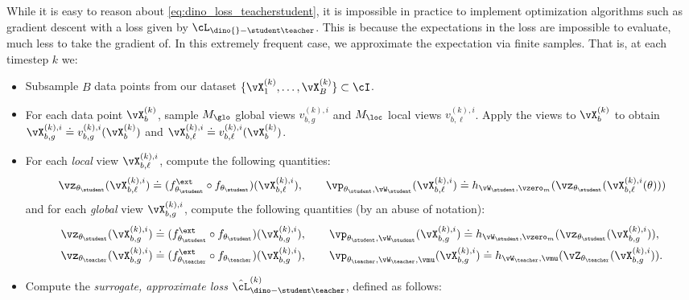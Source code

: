 \documentclass[../../book-main.tex]{subfiles}
\begin{document}
While it is easy to reason about \eqref{eq:dino_loss_teacherstudent}, it is impossible in practice to implement optimization algorithms such as gradient descent with a loss given by \(\cL_{\dino{}-\student\teacher}\). This is because the expectations in the loss are impossible to evaluate, much less to take the gradient of. In this extremely frequent case, we approximate the expectation via finite samples. That is, at each timestep \(k\) we:
\begin{itemize}
    \item Subsample \(B\) data points from our dataset \(\{\vX_{1}^{(k)}, \dots, \vX_{B}^{(k)}\} \subset \cI\).
    \item For each data point \(\vX_{b}^{(k)}\), sample \(M_{\glo}\) global views \(v_{b, g}^{(k), i}\) and \(M_{\loc}\) local views \(v_{b, \ell}^{(k), i}\). Apply the views to \(\vX_{b}^{(k)}\) to obtain \(\vX_{b, g}^{(k), i} \doteq v_{b, g}^{(k), i}(\vX_{b}^{(k)})\) and \(\vX_{b, \ell}^{(k), i} \doteq v_{b, \ell}^{(k), i}(\vX_{b}^{(k)})\).
    \item For each \textit{local} view \(\vX_{b, \ell}^{(k), i}\), compute the following quantities:
    \begin{equation}
        \vz_{\theta_{\student}}(\vX_{b, \ell}^{(k), i}) \doteq (f_{\theta_{\student}}^{\ext} \circ f_{\theta_{\student}})(\vX_{b, \ell}^{(k), i}), \qquad \vp_{\theta_{\student}, \vW_{\student}}(\vX_{b, \ell}^{(k), i}) \doteq h_{\vW_{\student}, \vzero_{m}}(\vz_{\theta_{\student}}(\vX_{b, \ell}^{(k), i}(\theta)))
    \end{equation}
    and for each \textit{global} view \(\vX_{b, g}^{(k), i}\), compute the following quantities (by an abuse of notation):
    \begin{align}
        &\vz_{\theta_{\student}}(\vX_{b, g}^{(k), i}) \doteq (f_{\theta_{\student}}^{\ext} \circ f_{\theta_{\student}})(\vX_{b, g}^{(k), i}), \qquad \vp_{\theta_{\student}, \vW_{\student}}(\vX_{b, g}^{(k), i}) \doteq h_{\vW_{\student}, \vzero_{m}}(\vz_{\theta_{\student}}(\vX_{b, g}^{(k), i})), \\
        &\vz_{\theta_{\teacher}}(\vX_{b, g}^{(k), i}) \doteq (f_{\theta_{\teacher}}^{\ext} \circ f_{\theta_{\teacher}})(\vX_{b, g}^{(k), i}), \qquad \vp_{\theta_{\teacher}, \vW_{\teacher}, \vmu}(\vX_{b, g}^{(k), i}) \doteq h_{\vW_{\teacher}, \vmu}(\vZ_{\theta_{\teacher}}(\vX_{b, g}^{(k), i})).
    \end{align}
    \item Compute the \textit{surrogate, approximate loss} \(\hat{\cL}_{\dino-\student\teacher}^{(k)}\), defined as follows: 

\end{itemize}
\end{document}
